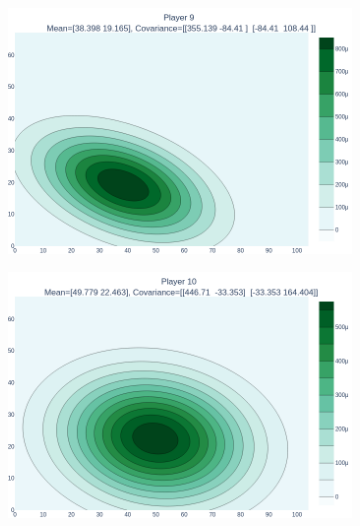 \documentclass[14pt,a4]{article}
\begin{document}
\begin{figure}[h]
\begin{subfigure}{0.3\linewidth}
    \end{subfigure}
    \hfill
    \begin{subfigure}{0.3\linewidth}
        \centering
        \includegraphics[scale=0.1]{images/q6/partb/9.png}
    \end{subfigure}
    \hfill
    \begin{subfigure}{0.3\linewidth}
        \centering
        \includegraphics[scale=0.1]{images/q6/partb/10.png}
    \end{subfigure}
    \newline
    \begin{subfigure}{0.3\linewidth}
        \centering

\end{subfigure}
\end{figure}
\end{document}
